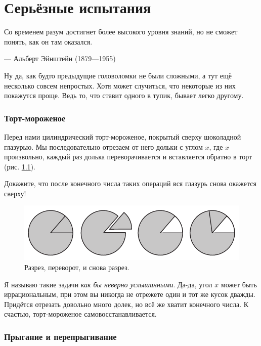 \chapter{Серьёзные испытания}


\setlength{\epigraphwidth}{.70\textwidth}
\epigraph{Со временем разум достигнет более высокого уровня знаний, но не сможет понять, как он там оказался.
}{--- Альберт Эйнштейн (1879---1955)}

Ну да, как будто предыдущие головоломки не были сложными, а тут ещё несколько совсем непростых.
Хотя может случиться, что некоторые из них покажутся проще.
Ведь то, что ставит одного в тупик, бывает легко другому.


\subsection*{Торт-мороженое}\label{Торт-мороженое}

Перед нами цилиндрический торт-мороженое, покрытый сверху шоколадной глазурью.
Мы последовательно отрезаем от него дольки с углом $x$, где $x$ произвольно,
каждый раз долька переворачивается и вставляется обратно в торт
(рис. \ref{pic:tort}).

Докажите, что после конечного числа таких операций вся глазурь снова окажется сверху!


\begin{figure}[htb!]
\centering
\includegraphics[scale=1]{pics/tort}
\caption{Разрез, переворот, и снова разрез.}
\label{pic:tort}
\end{figure}

Я называю такие задачи \emph{как бы неверно услышанными}.
Да-да, угол $x$ может быть иррациональным, 
при этом вы никогда не отрежете один и тот же кусок дважды.
Придётся отрезать довольно много долек, но всё же хватит конечного числа.
К счастью, торт-мороженое самовосстанавливается.

\subsection*{Прыгание и перепрыгивание}


